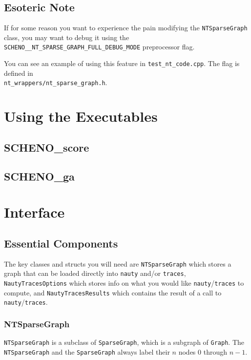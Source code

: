 \documentclass{article}
\begin{document}
\subsection{Esoteric Note}

If for some reason you want to experience the pain modifying the \verb|NTSparseGraph| class, you may want to debug it using the \verb|SCHENO__NT_SPARSE_GRAPH_FULL_DEBUG_MODE| preprocessor flag.

You can see an example of using this feature in \verb|test_nt_code.cpp|. The flag is defined in\\\verb|nt_wrappers/nt_sparse_graph.h|.

\newpage

\section{Using the Executables}\label{sec:binaries}

\subsection{SCHENO\_score}

\subsection{SCHENO\_ga}

\newpage

\section{Interface}\label{sec:interface}

\subsection{Essential Components}

The key classes and structs you will need are \verb|NTSparseGraph| which stores a graph that can be loaded directly into \verb|nauty| and/or \verb|traces|, \verb|NautyTracesOptions| which stores info on what you would like \verb|nauty|/\verb|traces| to compute, and \verb|NautyTracesResults| which contains the result of a call to \verb|nauty|/\verb|traces|.

\subsubsection{NTSparseGraph}

\verb|NTSparseGraph| is a subclass of \verb|SparseGraph|, which is a subgraph of \verb|Graph|. The \verb|NTSparseGraph| and the \verb|SparseGraph| always label their $n$ nodes 0 through $n - 1$.
\end{document}
